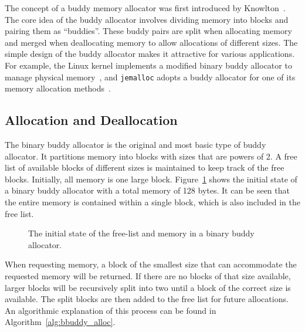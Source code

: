 The concept of a buddy memory allocator was first introduced by Knowlton~\cite{buddy}. The core idea of the buddy allocator involves dividing memory into blocks and pairing them as ``buddies''. These buddy pairs are split when allocating memory and merged when deallocating memory to allow allocations of different sizes. The simple design of the buddy allocator makes it attractive for various applications. For example, the Linux kernel implements a modified binary buddy allocator to manage physical memory~\cite{linuxbuddy}, and \texttt{jemalloc} adopts a buddy allocator for one of its memory allocation methods~\cite{jemalloc}.

\subsection{Allocation and Deallocation}
The binary buddy allocator is the original and most basic type of buddy allocator. It partitions memory into blocks with sizes that are powers of 2. A free list of available blocks of different sizes is maintained to keep track of the free blocks. Initially, all memory is one large block. Figure~\ref{fig:buddystart} shows the initial state of a binary buddy allocator with a total memory of 128 bytes. It can be seen that the entire memory is contained within a single block, which is also included in the free list.

\begin{figure}[h]
    \centering
    
    \caption{The initial state of the free-list and memory in a binary buddy allocator.}
    \label{fig:buddystart}
\end{figure}

When requesting memory, a block of the smallest size that can accommodate the requested memory will be returned. If there are no blocks of that size available, larger blocks will be recursively split into two until a block of the correct size is available. The split blocks are then added to the free list for future allocations. An algorithmic explanation of this process can be found in Algorithm~\ref{alg:bbuddy_alloc}.

